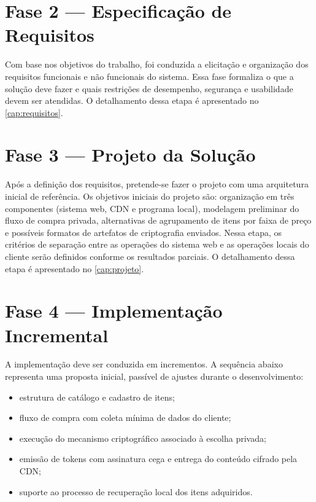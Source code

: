 \documentclass[12pt, oneside, a4paper, english, brazil]{abntex2}
\begin{document}
\section{Fase 2 --- Especificação de Requisitos}

Com base nos objetivos do trabalho, foi conduzida a elicitação e organização
dos requisitos funcionais e não funcionais do sistema. Essa fase formaliza o
que a solução deve fazer e quais restrições de desempenho, segurança e
usabilidade devem ser atendidas. O detalhamento dessa etapa é apresentado no
\autoref{cap:requisitos}.

\section{Fase 3 --- Projeto da Solução}

Após a definição dos requisitos, pretende-se fazer o projeto com uma
arquitetura inicial de referência. Os objetivos iniciais do projeto são:
organização em três componentes (sistema web, CDN e programa local), modelagem
preliminar do fluxo de compra privada, alternativas de agrupamento de itens
por faixa de preço e possíveis formatos de artefatos de criptografia enviados.
Nessa etapa, os critérios de separação entre as operações do sistema web e as
operações locais do cliente serão definidos conforme os resultados parciais. O
detalhamento dessa etapa é apresentado no \autoref{cap:projeto}.

\section{Fase 4 --- Implementação Incremental}

A implementação deve ser conduzida em incrementos. A sequência abaixo
representa uma proposta inicial, passível de ajustes durante o
desenvolvimento:

\begin{itemize}
\item estrutura de catálogo e cadastro de itens;
\item fluxo de compra com coleta mínima de dados do cliente;
\item execução do mecanismo criptográfico associado à escolha privada;
\item emissão de tokens com assinatura cega e entrega do conteúdo cifrado pela
CDN;
\item suporte ao processo de recuperação local dos itens adquiridos.
\end{itemize}
\end{document}

